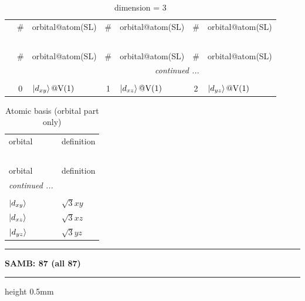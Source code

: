 \documentclass[fleqn,10pt,landscape]{jsarticle}
\begin{document}
\renewcommand{\arraystretch}{1.6}
\begin{longtable}[l]{c|cl|cl|cl}
\captionsetup{justification=raggedright, singlelinecheck=off}
\caption{dimension = 3}
 \\
 \hline \hline
 & \# & orbital@atom(SL) & \# & orbital@atom(SL) & \# & orbital@atom(SL) \\ \hline \endfirsthead

\multicolumn{6}{l}{\tablename\ \thetable{}} \\
 \hline \hline
 & \# & orbital@atom(SL) & \# & orbital@atom(SL) & \# & orbital@atom(SL) \\ \hline \endhead

 \hline \hline
\multicolumn{6}{r}{\footnotesize\it continued ...} \\ \endfoot

 \hline \hline
\multicolumn{6}{r}{} \\ \endlastfoot

 & 0 & $\ket{d_{xy}}@{\rm V}(1)$ & 1 & $\ket{d_{xz}}@{\rm V}(1)$ & 2 & $\ket{d_{yz}}@{\rm V}(1)$ \\
\end{longtable}
\renewcommand{\arraystretch}{1.6}
\begin{longtable}[l]{ll}
\captionsetup{justification=raggedright, singlelinecheck=off}
\caption{Atomic basis (orbital part only)}
 \\
 \hline \hline
orbital & definition \\ \hline \endfirsthead

\multicolumn{1}{l}{\tablename\ \thetable{}} \\
 \hline \hline
orbital & definition \\ \hline \endhead

 \hline \hline
\multicolumn{1}{r}{\footnotesize\it continued ...} \\ \endfoot

 \hline \hline
\multicolumn{1}{r}{} \\ \endlastfoot

$ \ket{d_{xy}} $ & $ \sqrt{3} x y $ \\
$ \ket{d_{xz}} $ & $ \sqrt{3} x z $ \\
$ \ket{d_{yz}} $ & $ \sqrt{3} y z $ \\
\end{longtable}
\vspace{5mm}
\noindent \rule[0.5mm]{5mm}{0.5mm}\hspace{3mm}\textbf{SAMB: 87 (all 87)}\hspace{3mm}\leaders\hrule height 0.5mm\hfill\kern0pt
\vspace{3mm}
\end{document}
